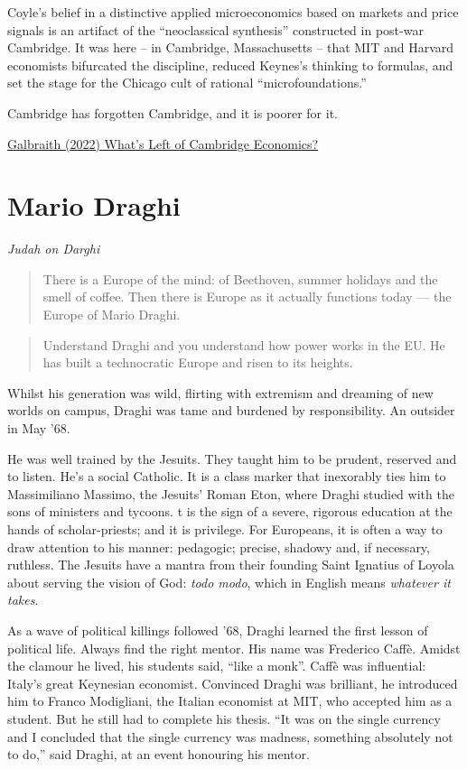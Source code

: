 \documentclass[
]{book}
\begin{document}
Coyle's belief in a distinctive applied microeconomics based on markets and price signals is an artifact of the ``neoclassical synthesis'' constructed in post-war Cambridge. It was here -- in Cambridge, Massachusetts -- that MIT and Harvard economists bifurcated the discipline, reduced Keynes's thinking to formulas, and set the stage for the Chicago cult of rational ``microfoundations.''

Cambridge has forgotten Cambridge, and it is poorer for it.

\href{https://www.project-syndicate.org/onpoint/whats-wrong-with-economics-by-james-k-galbraith-2022-01}{Galbraith (2022) What's Left of Cambridge Economics?}

\hypertarget{mario-draghi}{%
\section{Mario Draghi}\label{mario-draghi}}

\emph{Judah on Darghi}

\begin{quote}
There is a Europe of the mind: of Beethoven, summer holidays and the smell of coffee.
Then there is Europe as it actually functions today --- the Europe of Mario Draghi.
\end{quote}

\begin{quote}
Understand Draghi and you understand how power works in the EU. He has built a
technocratic Europe and risen to its heights.
\end{quote}

Whilst his generation was wild, flirting with extremism and dreaming of new worlds on
campus, Draghi was tame and burdened by responsibility. An outsider in May '68.

He was well trained by the Jesuits.
They taught him to be prudent, reserved and to listen. He's a social Catholic.
It is a class marker that inexorably ties him to Massimiliano Massimo, the Jesuits'
Roman Eton, where Draghi studied with the sons of ministers and tycoons.
t is the sign of a severe, rigorous education at the hands of scholar-priests; and it
is privilege. For Europeans, it is often a way to draw attention to his manner:
pedagogic; precise, shadowy and, if necessary, ruthless.
The Jesuits have a mantra from their founding Saint Ignatius of Loyola about serving
the vision of God: \emph{todo modo}, which in English means \emph{whatever it takes}.

As a wave of political killings followed '68, Draghi learned the first lesson of
political life. Always find the right mentor. His name was Frederico Caffè.
Amidst the clamour he lived, his students said, ``like a monk''.
Caffè was influential: Italy's great Keynesian economist.
Convinced Draghi was brilliant, he introduced him to Franco Modigliani,
the Italian economist at MIT, who accepted him as a student.
But he still had to complete his thesis.
``It was on the single currency and I concluded that the single currency was madness,
something absolutely not to do,'' said Draghi, at an event honouring his mentor.
\end{document}
